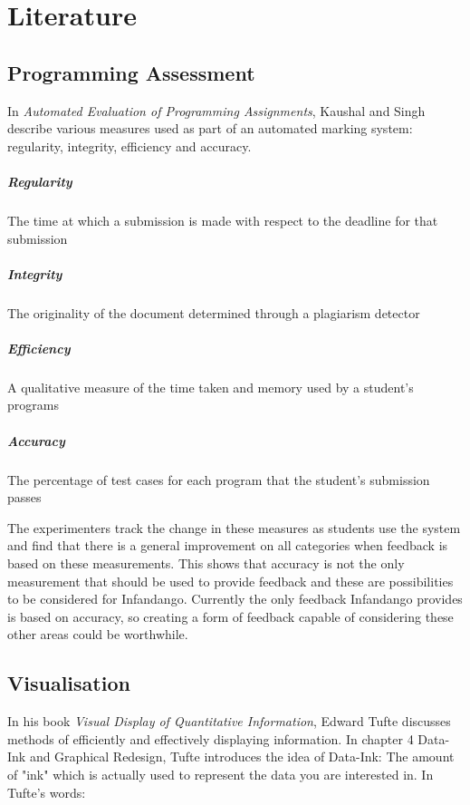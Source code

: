 \chapter{Literature}
\label{background}

\section{Programming Assessment}
In {\it Automated Evaluation of Programming Assignments}\cite{automate_evaluation}, Kaushal and Singh describe various measures used as part of an automated marking system: regularity, integrity, efficiency and accuracy. 
\paragraph*{Regularity} The time at which a submission is made with respect to the deadline for that submission
\paragraph*{Integrity} The originality of the document determined through a plagiarism detector
\paragraph*{Efficiency} A qualitative measure of the time taken and memory used by a student's programs
\paragraph*{Accuracy} The percentage of test cases for each program that the student's submission passes

The experimenters track the change in these measures as students use the system and find that there is a general improvement on all categories when feedback is based on these measurements. This shows that accuracy is not the only measurement that should be used to provide feedback and these are possibilities to be considered for Infandango. Currently the only feedback Infandango provides is based on accuracy, so creating a form of feedback capable of considering these other areas could be worthwhile.

\section{Visualisation}
In his book {\it Visual Display of Quantitative Information}\cite{visual_explanations}, Edward Tufte discusses methods of efficiently and effectively displaying information. In chapter 4 Data-Ink and Graphical Redesign, Tufte introduces the idea of Data-Ink: The amount of "ink" which is actually used to represent the data you are interested in. In Tufte's words:

